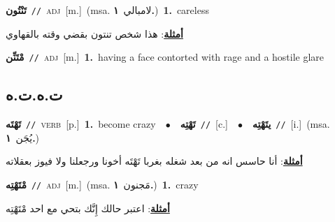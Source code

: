 \documentclass[10pt,a4paper,twoside]{article} %
\begin{document}
\begin{multicols}{2}
{\setlength\topsep{0pt}\textbf{\foreignlanguage{arabic}{تَنْتُون}}\ {\color{gray}\texttt{//}\color{black}}\ \textsc{adj}\ [m.]\ \color{gray}(msa. \foreignlanguage{arabic}{لامبالي}~\foreignlanguage{arabic}{\textbf{١.}})\color{black}\ \textbf{1.}~careless\  \begin{flushright}\color{gray}\foreignlanguage{arabic}{\textbf{\underline{\foreignlanguage{arabic}{أمثلة}}}: هذا شخص تنتون بقضي وقته بالقهاوي}\end{flushright}\color{black}} \vspace{2mm}

{\setlength\topsep{0pt}\textbf{\foreignlanguage{arabic}{مْتَنِّن}}\ {\color{gray}\texttt{//}\color{black}}\ \textsc{adj}\ [m.]\ \textbf{1.}~having a face contorted with rage and a hostile glare\ } \vspace{2mm}

\vspace{-3mm}
\subsection*{\color{blue}\foreignlanguage{arabic}{ت.ه.ت.ه}\color{blue}{}} 

{\setlength\topsep{0pt}\textbf{\foreignlanguage{arabic}{تَهْتَه}}\ {\color{gray}\texttt{//}\color{black}}\ \textsc{verb}\ [p.]\ \textbf{1.}~become crazy\ \ $\bullet$\ \ \setlength\topsep{0pt}\textbf{\foreignlanguage{arabic}{تَهْتِه}}\ {\color{gray}\texttt{//}\color{black}}\ [c.]\ \ $\bullet$\ \ \setlength\topsep{0pt}\textbf{\foreignlanguage{arabic}{يتَهْتِه}}\ {\color{gray}\texttt{//}\color{black}}\ [i.]\ \color{gray}(msa. \foreignlanguage{arabic}{يُجَن}~\foreignlanguage{arabic}{\textbf{١.}})\color{black}\  \begin{flushright}\color{gray}\foreignlanguage{arabic}{\textbf{\underline{\foreignlanguage{arabic}{أمثلة}}}: أنا حاسس انه من بعد شغله بغربا تَهْتَه أخونا ورجعلنا ولا فيوز بعقلاته}\end{flushright}\color{black}} \vspace{2mm}

{\setlength\topsep{0pt}\textbf{\foreignlanguage{arabic}{مْتَهْتِه}}\ {\color{gray}\texttt{//}\color{black}}\ \textsc{adj}\ [m.]\ \color{gray}(msa. \foreignlanguage{arabic}{مَجنون}~\foreignlanguage{arabic}{\textbf{١.}})\color{black}\ \textbf{1.}~crazy\  \begin{flushright}\color{gray}\foreignlanguage{arabic}{\textbf{\underline{\foreignlanguage{arabic}{أمثلة}}}: اعتبر حالك إِنَّك بتحي مع احد مْتَهْتِه}\end{flushright}\color{black}} \vspace{2mm}


\end{multicols}
\end{document}
